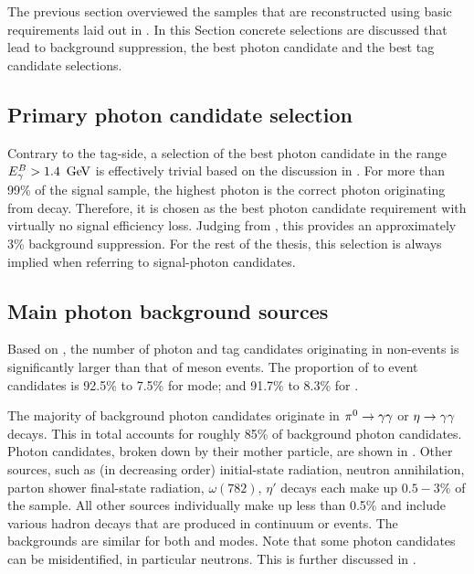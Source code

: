 The previous section overviewed the samples that are reconstructed using basic requirements laid out in .
In this Section concrete selections are discussed that lead to background suppression, the best photon candidate
and the best tag candidate selections.

\subsection{Primary photon candidate selection}\label{sec:primary_photon_candidate_selection}
Contrary to the tag-side, a selection of the best photon candidate in the range ${E^B_{\gamma}}>1.4~\mathrm{\,Ge\kern -0.1em V}$ 
is effectively trivial based on the discussion in .
For more than 99\% of the signal \MC sample, the highest \EB photon 
is the correct photon originating from \BtoXsgamma decay.
Therefore, it is chosen as the best photon candidate requirement with virtually no signal efficiency loss.
Judging from , this provides an approximately 3\% background suppression.
For the rest of the thesis, this selection is always implied when referring to signal-photon candidates.

\subsection{Main photon background sources}\label{sec:main_background_sources}

Based on , the number of photon and tag candidates originating 
in non-\BB events is significantly larger than that of \B meson events.
The proportion of \qqbar to \BB event candidates is 92.5\% to 7.5\% for \feiBp mode;
and 91.7\% to 8.3\% for \feiBz.

The majority of background photon candidates originate in $\pi^0\rightarrow\gamma\gamma$ or $\eta\rightarrow\gamma\gamma$ decays.
This in total accounts for roughly 85\% of background photon candidates.
Photon candidates, broken down by their mother particle, are shown in .
Other sources, such as (in decreasing order) initial-state radiation, neutron annihilation, parton shower final-state radiation, $\omega(782)$, $\eta'$ decays each make up $0.5-3\%$ of the sample.
All other sources individually make up less than 0.5\% and include various hadron decays that are produced in continuum or \B events.
The backgrounds are similar for both \feiBp and \feiBz modes.
Note that some photon candidates can be misidentified, in particular neutrons. 
This is further discussed in .

